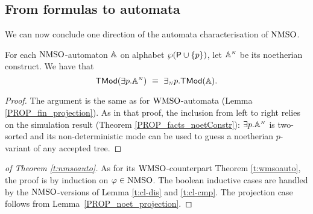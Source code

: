 \subsection{From formulas to automata}

We can now conclude one direction of the automata characterisation of $\mathrm{NMSO}$.

\begin{lemma}\label{PROP_noet_projection}
For each $\mathrm{NMSO}$-automaton $\mathbb{A}$ on alphabet $\wp (\mathsf{P} \cup \{p\})$, let
$\mathbb{A}^{{\scriptscriptstyle N}}$ be its noetherian construct.
We have that
$$\mathsf{TMod}({{\exists} p}.\mathbb{A}^{{\scriptscriptstyle N}}) \ \equiv\
{{\exists_{{\scriptscriptstyle N}}} p}.\mathsf{TMod}(\mathbb{A}).
$$
\end{lemma}

\begin{proof} 
The argument is the same as for $\mathrm{WMSO}$-automata (Lemma \ref{PROP_fin_projection}). As in that proof, the inclusion from left to right relies on the simulation result (Theorem \ref{PROP_facts_noetConstr}): ${{\exists} p}.\mathbb{A}^{{\scriptscriptstyle N}}$ is two-sorted and its non-deterministic mode can be used to guess a noetherian $p$-variant of any accepted tree. \end{proof}

\begin{proof}[of Theorem \ref{t:nmsoauto}] 
As for its $\mathrm{WMSO}$-counterpart Theorem \ref{t:wmsoauto}, the proof is by
induction on $\varphi \in \mathrm{NMSO}$. 
The boolean inductive cases are handled by the $\mathrm{NMSO}$-versions of 
Lemma \ref{t:cl-dis} and \ref{t:cl-cmp}. 
The projection case follows from Lemma~\ref{PROP_noet_projection}.
\end{proof}

